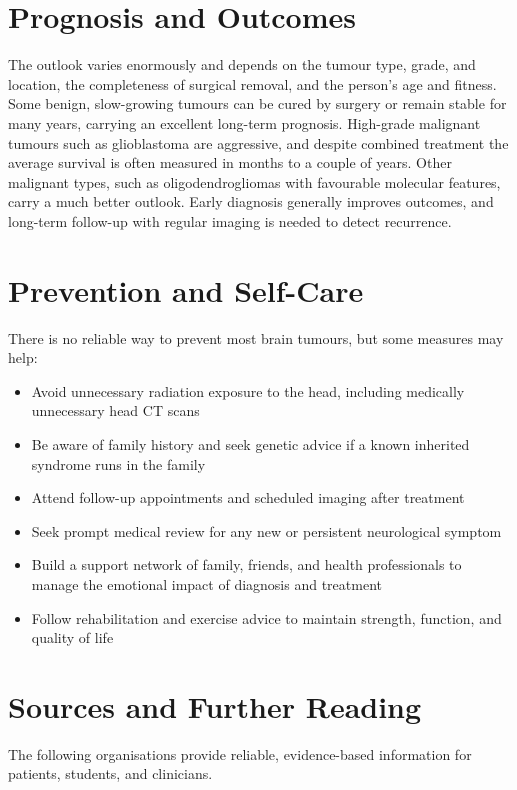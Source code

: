 \section*{Prognosis and Outcomes}
The outlook varies enormously and depends on the tumour type, grade, and location, the completeness of surgical removal, and the person's age and fitness. Some benign, slow-growing tumours can be cured by surgery or remain stable for many years, carrying an excellent long-term prognosis. High-grade malignant tumours such as glioblastoma are aggressive, and despite combined treatment the average survival is often measured in months to a couple of years. Other malignant types, such as oligodendrogliomas with favourable molecular features, carry a much better outlook. Early diagnosis generally improves outcomes, and long-term follow-up with regular imaging is needed to detect recurrence.

\section*{Prevention and Self-Care}
There is no reliable way to prevent most brain tumours, but some measures may help:

\begin{itemize}
    \item Avoid unnecessary radiation exposure to the head, including medically unnecessary head CT scans
    \item Be aware of family history and seek genetic advice if a known inherited syndrome runs in the family
    \item Attend follow-up appointments and scheduled imaging after treatment
    \item Seek prompt medical review for any new or persistent neurological symptom
    \item Build a support network of family, friends, and health professionals to manage the emotional impact of diagnosis and treatment
    \item Follow rehabilitation and exercise advice to maintain strength, function, and quality of life
\end{itemize}

\section*{Sources and Further Reading}
The following organisations provide reliable, evidence-based information for patients, students, and clinicians.

